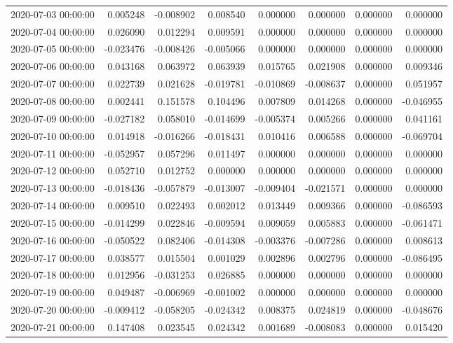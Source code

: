 \begin{tabular}{lrrrrrrr}
2020-07-03 00:00:00 & 0.005248 & -0.008902 & 0.008540 & 0.000000 & 0.000000 & 0.000000 & 0.000000 \\
2020-07-04 00:00:00 & 0.026090 & 0.012294 & 0.009591 & 0.000000 & 0.000000 & 0.000000 & 0.000000 \\
2020-07-05 00:00:00 & -0.023476 & -0.008426 & -0.005066 & 0.000000 & 0.000000 & 0.000000 & 0.000000 \\
2020-07-06 00:00:00 & 0.043168 & 0.063972 & 0.063939 & 0.015765 & 0.021908 & 0.000000 & 0.009346 \\
2020-07-07 00:00:00 & 0.022739 & 0.021628 & -0.019781 & -0.010869 & -0.008637 & 0.000000 & 0.051957 \\
2020-07-08 00:00:00 & 0.002441 & 0.151578 & 0.104496 & 0.007809 & 0.014268 & 0.000000 & -0.046955 \\
2020-07-09 00:00:00 & -0.027182 & 0.058010 & -0.014699 & -0.005374 & 0.005266 & 0.000000 & 0.041161 \\
2020-07-10 00:00:00 & 0.014918 & -0.016266 & -0.018431 & 0.010416 & 0.006588 & 0.000000 & -0.069704 \\
2020-07-11 00:00:00 & -0.052957 & 0.057296 & 0.011497 & 0.000000 & 0.000000 & 0.000000 & 0.000000 \\
2020-07-12 00:00:00 & 0.052710 & 0.012752 & 0.000000 & 0.000000 & 0.000000 & 0.000000 & 0.000000 \\
2020-07-13 00:00:00 & -0.018436 & -0.057879 & -0.013007 & -0.009404 & -0.021571 & 0.000000 & 0.000000 \\
2020-07-14 00:00:00 & 0.009510 & 0.022493 & 0.002012 & 0.013449 & 0.009366 & 0.000000 & -0.086593 \\
2020-07-15 00:00:00 & -0.014299 & 0.022846 & -0.009594 & 0.009059 & 0.005883 & 0.000000 & -0.061471 \\
2020-07-16 00:00:00 & -0.050522 & 0.082406 & -0.014308 & -0.003376 & -0.007286 & 0.000000 & 0.008613 \\
2020-07-17 00:00:00 & 0.038577 & 0.015504 & 0.001029 & 0.002896 & 0.002796 & 0.000000 & -0.086495 \\
2020-07-18 00:00:00 & 0.012956 & -0.031253 & 0.026885 & 0.000000 & 0.000000 & 0.000000 & 0.000000 \\
2020-07-19 00:00:00 & 0.049487 & -0.006969 & -0.001002 & 0.000000 & 0.000000 & 0.000000 & 0.000000 \\
2020-07-20 00:00:00 & -0.009412 & -0.058205 & -0.024342 & 0.008375 & 0.024819 & 0.000000 & -0.048676 \\
2020-07-21 00:00:00 & 0.147408 & 0.023545 & 0.024342 & 0.001689 & -0.008083 & 0.000000 & 0.015420 \\

\end{tabular}
